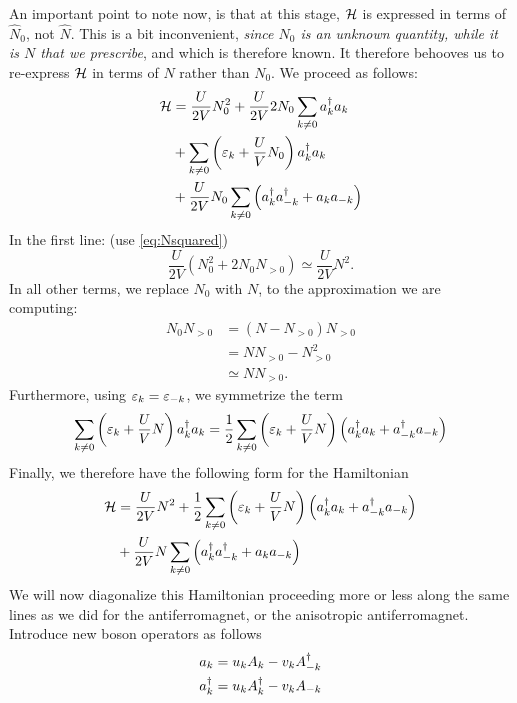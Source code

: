 An important point to note now, is that at this stage, $\mathcal{H}$ is expressed in terms of $\hat{N}_0$, not $\hat{N}$. This is a bit inconvenient, \emph{since $N_0$ is an unknown quantity, while it is $N$ that we prescribe}, and which is therefore known. It therefore behooves us to re-express $\mathcal{H}$ in terms of $N$ rather than $N_0$. We proceed as follows:
\begin{align*}
	\mathcal{H} &= \frac{U}{2V}N_{0}^{2} + \frac{U}{2V}2N_{0}\sum_{k\ne0}a_{k}^{\dagger}a_{k} \\ 
	&+ \sum_{k\ne0}\left (\varepsilon_k + \frac{U}{V}N_0\right )a_{k}^{\dagger}a_{k} \\
	&+  \frac{U}{2V}N_0 \sum_{k\ne0}\left (a_{k}^{\dagger}a_{-k}^{\dagger} + a_{k}a_{-k}\right )
\end{align*}
In the first line: (use \cref{eq:Nsquared})
\begin{equation}
	\frac{U}{2V}(N_0^2 + 2N_0N_{>0}) \simeq \frac{U}{2V}N^2.
\end{equation}
In all other terms, we replace $N_0$ with $N$, to the approximation we are computing: 
\begin{equation}
	\begin{aligned}
		N_0N_{>0} &= (N-N_{>0})N_{>0} \\
		&= NN_{>0} - N_{>0}^2 \\
		&\simeq NN_{>0}.
	\end{aligned}
\end{equation}
Furthermore, using $\varepsilon_k = \varepsilon_{-k}$, we symmetrize the term
\begin{equation}
	\sum_{k\ne0}\left (\varepsilon_k + \frac{U}{V}N\right )a_{k}^{\dagger}a_{k} = \frac{1}{2}\sum_{k\ne0}\left (\varepsilon_k + \frac{U}{V}N\right )\left (a_{k}^{\dagger}a_{k} + a_{-k}^{\dagger}a_{-k}\right )
\end{equation}
Finally, we therefore have the following form for the Hamiltonian
\begin{equation}
	\begin{aligned}
		\mathcal{H} &= \frac{U}{2V}N^2 + \frac{1}{2}\sum_{k\ne0}\left (\varepsilon_k + \frac{U}{V}N\right )\left (a_{k}^{\dagger}a_{k} + a_{-k}^{\dagger}a_{-k}\right ) \\
		&+\frac{U}{2V}N \sum_{k\ne0}\left (a_{k}^{\dagger}a_{-k}^{\dagger} + a_{k}a_{-k}\right )
	\end{aligned}
\end{equation}
We will now diagonalize this Hamiltonian proceeding more or less along the same lines as we did for the antiferromagnet, or the anisotropic antiferromagnet. 
Introduce new boson operators as follows
\begin{equation}
	\begin{aligned}
		a_k &= u_kA_k-v_kA_{-k}^{\dagger} \\
		a_k^{\dagger} &= u_kA_k^{\dagger}-v_kA_{-k}
	\end{aligned}
\end{equation}

